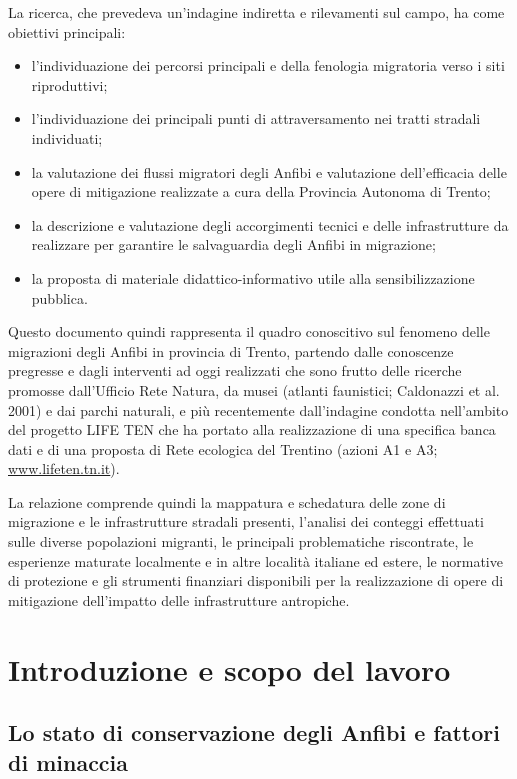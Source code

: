 \documentclass[11pt,a4paper,twoside]{memoir}
\begin{document}
La ricerca, che prevedeva un’indagine indiretta e rilevamenti sul campo, ha come obiettivi principali:
\begin{itemize}\itemsep0pt
  \item l’individuazione dei percorsi principali e della fenologia migratoria verso i siti riproduttivi;
  \item l’individuazione dei principali punti di attraversamento nei tratti stradali individuati;
  \item la valutazione dei flussi migratori degli Anfibi e valutazione dell’efficacia delle opere di mitigazione realizzate a cura della Provincia Autonoma di Trento;
  \item la descrizione e valutazione degli accorgimenti tecnici e delle infrastrutture da realizzare per garantire le salvaguardia degli Anfibi in migrazione;
  \item la proposta  di materiale didattico-informativo utile alla sensibilizzazione pubblica.
\end{itemize}

Questo documento quindi rappresenta il quadro conoscitivo sul fenomeno delle migrazioni degli Anfibi in provincia di Trento, partendo dalle conoscenze pregresse e dagli interventi ad oggi realizzati  che sono frutto delle ricerche promosse dall’Ufficio Rete Natura, da musei (atlanti faunistici; Caldonazzi et al. 2001) e dai parchi naturali, e più recentemente dall’indagine condotta nell’ambito del progetto LIFE TEN che ha portato alla realizzazione di una specifica banca dati e di una proposta di Rete ecologica del Trentino (azioni A1 e A3; \url{www.lifeten.tn.it}). 

La relazione comprende quindi la mappatura e schedatura delle zone di migrazione e le infrastrutture stradali presenti, l'analisi dei conteggi effettuati sulle diverse popolazioni migranti, le principali problematiche riscontrate, le esperienze maturate localmente e in altre località italiane ed estere, le normative di protezione e gli strumenti finanziari disponibili per la realizzazione di opere di mitigazione dell'impatto delle infrastrutture antropiche.


\chapter{Introduzione e scopo del lavoro}
\label{chap:intro}
\section{Lo stato di conservazione degli Anfibi e fattori di minaccia}
\label{sec:intro_statocons}
\end{document}
